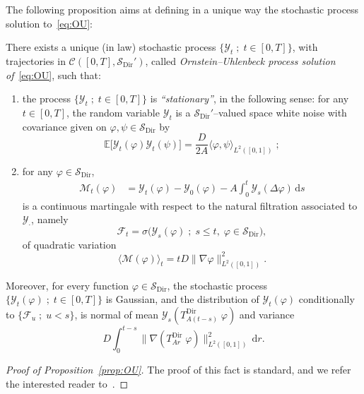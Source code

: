 \documentclass[AHL,Unicode,longabstracts]{cedram}
\DeclareMathOperator{\Dir}{Dir}
\newcommand{\bb}[1]{{\mathbb #1}}
\newcommand{\mc}[1]{{\mathcal #1}}
\renewcommand{\mc}[1]{{\mathcal #1}}
\newcommand{\SD}{\ensuremath{\mc S_{\Dir}}}
\renewcommand{\leq}{\leqslant}
\newcommand*{\dd}{\mathrm{d}}
\newcommand*{\dr}{\dd r}
\newcommand*{\ds}{\dd s}
\begin{document}

The following proposition aims at defining in a unique way the stochastic process solution to~\eqref{eq:OU}:

\begin{prop}\label{prop:OU}
There exists a unique (in law) stochastic process $\{\mc Y_t \; ;\; t\in[0,T]\}$, with trajectories in $\mc C([0,T],\SD')$, called \emph{Ornstein--Uhlenbeck process solution of}~\eqref{eq:OU}, such that:
\begin{enumerate}
\item \label{3.1.1} the process $\{\mc Y_t \; ; \; t \in [0,T]\}$ is \emph{``stationary''}, in the following sense: for any $t\in[0,T]$, the random variable $\mc Y_t$ is a $\SD'$--valued space white noise with covariance given on $\varphi,\psi \in \SD$ by
\[
\bb E \big[\mc Y_t(\varphi) \mc Y_t(\psi)\big] =\frac{D}{2A} \langle \varphi, \psi \rangle_{L^2([0,1])}\; ;
\]
\item \label{3.1.2} for any $\varphi \in \mc S_{\Dir}$,
\begin{align*}
\mc M_t(\varphi)&= \mc Y_t(\varphi)-\mc Y_0(\varphi) - A\int_0^t \mc Y_s(\Delta \varphi)\,\ds
\end{align*}
is a continuous martingale with respect to the natural filtration associated to $\mc Y_\cdot$, namely
\begin{equation}\label{eq:naturalfiltration}
\mc F_t=\sigma\big(\mc Y_s(\varphi)\; ; \; s \leq t, \; \varphi \in \mc S_{\Dir} \big),
\end{equation}
of quadratic variation
\[
\big\langle \mc M (\varphi) \big\rangle_t = t D \big\|\nabla \varphi\big\|^2_{L^2([0,1])}.
\]
\end{enumerate}
Moreover, for every function $\varphi \in \mc S_{\Dir}$, the stochastic process $\{\mc Y_t(\varphi)\; ; \; t \in [0,T]\}$ is Gaussian, and the distribution of $\mc Y_t(\varphi)$ conditionally to $\{\mc F_u \; ; \; u < s\}$, is normal of mean $\mc Y_s(T_{{A(t-s)}}^{\Dir}\; \varphi)$ and variance
\[
{D} \int_0^{t-s}\big\|\nabla (T_{{A}r}^{\Dir} \; \varphi) \big\|^2_{L^2([0,1])} \,\dr.
\]
\end{prop}

\begin{proof}[Proof of Proposition~\ref{prop:OU}]
The proof of this fact is standard, and we refer the interested reader to~\cite{kl,LMO}.
\end{proof}
\end{document}

